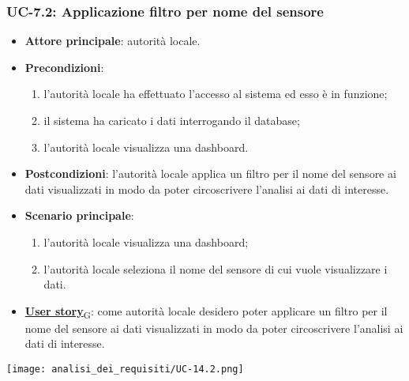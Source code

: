 \subsubsection{UC-7.2: Applicazione filtro per nome del sensore}
\begin{itemize}
	\item \textbf{Attore principale}: autorità locale.
	\item \textbf{Precondizioni}:
	      \begin{enumerate}
		      \item l'autorità locale ha effettuato l'accesso al sistema ed esso è in funzione;
		      \item il sistema ha caricato i dati interrogando il database;
		      \item l'autorità locale visualizza una dashboard.
	      \end{enumerate}
	\item \textbf{Postcondizioni}: l'autorità locale applica un filtro per il nome del sensore ai dati visualizzati in modo da poter circoscrivere l'analisi ai dati di interesse.
	\item \textbf{Scenario principale}:
	      \begin{enumerate}
		      \item l'autorità locale visualizza una dashboard;
		      \item l'autorità locale seleziona il nome del sensore di cui vuole visualizzare i dati.
	      \end{enumerate}
	\item \href{https://7last.github.io/docs/pb/documentazione-interna/glossario\#user-story}{\textbf{User story}\textsubscript{G}}:
	      come autorità locale desidero poter applicare un filtro per il nome del sensore ai dati visualizzati in modo da poter circoscrivere l'analisi ai dati di interesse.
\end{itemize}
\begin{center}
	\texttt{[image: analisi\_dei\_requisiti/UC-14.2.png]}
\end{center}

